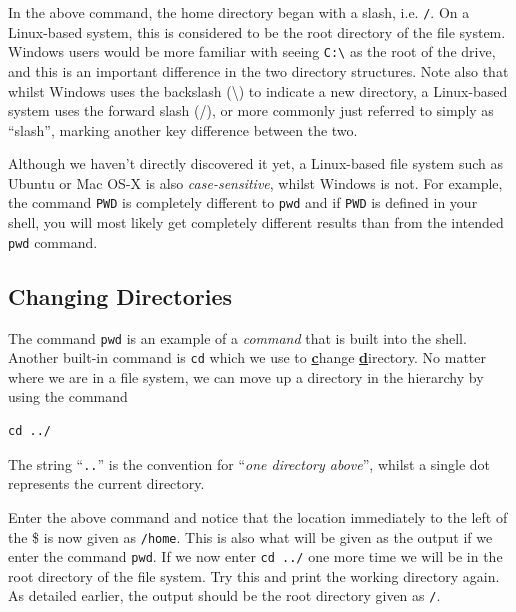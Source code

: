\documentclass[a4paper,12pt,twoside]{memoir}
\begin{document}
\begin{information}
In the above command, the home directory began with a slash, i.e. \texttt{/}.
On a Linux-based system, this is considered to be the root directory of the file system. 
Windows users would be more familiar with seeing \texttt{C:\textbackslash} as the root of the drive, and this is an important difference in the two directory structures.
Note also that whilst Windows uses the backslash (\textbackslash) to indicate a new directory, a Linux-based system uses the forward slash (/), or more commonly just referred to simply as ``slash'', marking another key difference between the two. \\
\end{information}

\begin{warning}
Although we haven't directly discovered it yet, a Linux-based file system such as Ubuntu or Mac OS-X is also \textit{case-sensitive}, whilst Windows is not.
For example, the command \texttt{PWD} is completely different to \texttt{pwd} and if \texttt{PWD} is defined in your shell, you will most likely get completely different results than from the intended \texttt{pwd} command.
\end{warning}

\subsection{Changing Directories}
\begin{information}
The command \texttt{pwd} is an example of a \textit{command} that is built into the shell.
Another built-in command is \texttt{cd} which we use to \textbf{\underline{c}}hange \textbf{\underline{d}}irectory.
No matter where we are in a file system, we can move up a directory in the hierarchy by using the command 
\begin{lstlisting}
cd ../
\end{lstlisting}
The string ``\texttt{..}'' is the convention for ``\textit{one directory above}'', whilst a single dot represents the current directory. \\
\end{information}

\begin{steps}
Enter the above command and notice that the location immediately to the left of the \$ is now given as \texttt{/home}.
This is also what will be given as the output if we enter the command \texttt{pwd}.
If we now enter \texttt{cd ../} one more time we will be in the root directory of the file system.
Try this and print the working directory again.
As detailed earlier, the output should be the root directory given as \texttt{/}. \\
\end{steps}
\end{document}
